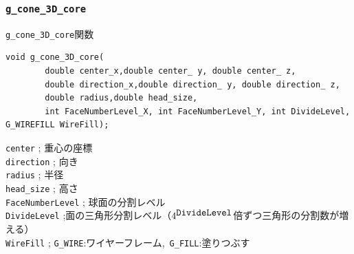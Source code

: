 \documentclass[a4paper,12pt]{jsarticle}%
\begin{document}


\clearpage
\subsubsection{\texttt{g\_cone\_3D\_core}}

\begin{itembox}[l]{\texttt{g\_cone\_3D\_core}関数}
\begin{verbatim}
void g_cone_3D_core(
        double center_x,double center_ y, double center_ z,
        double direction_x,double direction_ y, double direction_ z,
        double radius,double head_size,
        int FaceNumberLevel_X, int FaceNumberLevel_Y, int DivideLevel, G_WIREFILL WireFill);
\end{verbatim}
\verb|center| ; 重心の座標\\
\verb|direction| ; 向き\\
\verb|radius| ; 半径\\
\verb|head_size| ; 高さ\\
\verb|FaceNumberLevel| ; 球面の分割レベル\\
\verb|DivideLevel| ;面の三角形分割レベル（$4^{\verb|DivideLevel|}$倍ずつ三角形の分割数が増える）\\
\verb|WireFill| ; \verb|G_WIRE|:ワイヤーフレーム,\ \verb|G_FILL|:塗りつぶす \\
\end{itembox}
\end{document}
